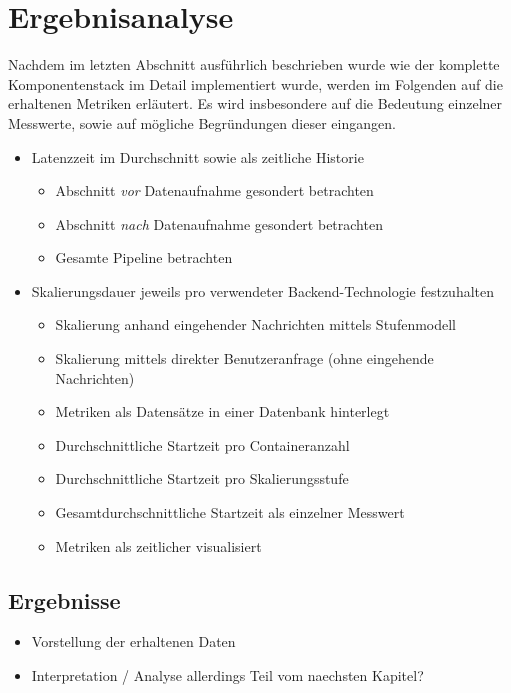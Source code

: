 \chapter{Ergebnisanalyse}

Nachdem im letzten Abschnitt ausführlich beschrieben wurde wie der komplette Komponentenstack im Detail implementiert wurde, werden im Folgenden auf die erhaltenen Metriken erläutert. Es wird insbesondere auf die Bedeutung einzelner Messwerte, sowie auf mögliche Begründungen dieser eingangen.


\begin{itemize}
  \item Latenzzeit im Durchschnitt sowie als zeitliche Historie
  \begin{itemize}
    \item Abschnitt \emph{vor} Datenaufnahme gesondert betrachten
    \item Abschnitt \emph{nach} Datenaufnahme gesondert betrachten
    \item Gesamte Pipeline betrachten
  \end{itemize}
  \item Skalierungsdauer jeweils pro verwendeter Backend-Technologie festzuhalten
  \begin{itemize}
    \item Skalierung anhand eingehender Nachrichten mittels Stufenmodell
    \item Skalierung mittels direkter Benutzeranfrage (ohne eingehende Nachrichten)
    \item Metriken als Datensätze in einer Datenbank hinterlegt
    \item Durchschnittliche Startzeit pro Containeranzahl 
    \item Durchschnittliche Startzeit pro Skalierungsstufe 
    \item Gesamtdurchschnittliche Startzeit als einzelner Messwert
    \item Metriken als zeitlicher visualisiert
  \end{itemize}
\end{itemize}




\section{Ergebnisse}
\begin{itemize}
  \item Vorstellung der erhaltenen Daten
  \item Interpretation / Analyse allerdings Teil vom naechsten Kapitel?
\end{itemize}

